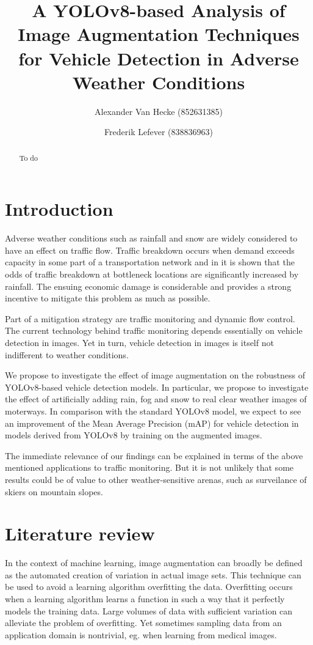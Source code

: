 \documentclass[]{article}
\title{
	A YOLOv8-based Analysis of Image Augmentation Techniques for Vehicle Detection in Adverse Weather Conditions}
\author{
		Alexander Van Hecke \small(852631385) \and 
		Frederik Lefever    \small(838836963)}
\begin{document}
\maketitle

\begin{abstract}
To do
\end{abstract}

\section{Introduction}

	Adverse weather conditions such as rainfall and snow are widely considered to have an effect on traffic flow. Traffic breakdown occurs when demand exceeds capacity in some part of a transportation network and in \cite{stralenInfluenceAdverseWeather2015} it is shown that the odds of traffic breakdown at bottleneck locations are significantly increased by rainfall. The ensuing economic damage is considerable and provides a strong incentive to mitigate this problem as much as possible. 
	
	Part of a mitigation strategy are traffic monitoring and dynamic flow control. The current technology behind traffic monitoring depends essentially on vehicle detection in images. Yet in turn, vehicle detection in images is itself not indifferent to weather conditions. 
	
	We propose to investigate the effect of image augmentation on the robustness of YOLO{\small v8}-based vehicle detection models. In particular, we propose to investigate the effect of artificially adding rain, fog and snow to real clear weather images of moterways. In comparison with the standard YOLO{\small v8} model, we expect to see an improvement of the Mean Average Precision (mAP) for vehicle detection in models derived from YOLO{\small v8} by training on the augmented images.
	
	The immediate relevance of our findings can be explained in terms of the above mentioned applications to traffic monitoring. But it is not unlikely that some results could be of value to other weather-sensitive arenas, such as surveilance of skiers on mountain slopes.

\section{Literature review}

	In the context of machine learning, image augmentation can broadly be defined as the automated creation of variation in actual image sets. This technique can be used to avoid a learning algorithm overfitting the data. Overfitting occurs when a learning algorithm learns a function in such a way that it perfectly models the training data. Large volumes of data with sufficient variation can alleviate the problem of overfitting. Yet sometimes sampling data from an application domain is nontrivial, eg. when learning from medical images. 
	
\end{document}
